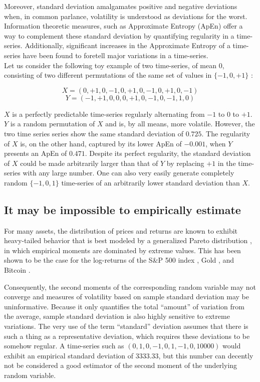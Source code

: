 \documentclass[12pt]{article}
\begin{document}
Moreover, standard deviation amalgamates positive and negative deviations when, in common parlance, volatility is understood as deviations for the worst. Information theoretic measures, such as Approximate Entropy (ApEn) \cite{pincus91} offer a way to complement these standard deviation by quantifying regularity in a time-series. Additionally, significant increases in the Approximate Entropy of a time-series have been found \cite{pincus04} to foretell major variations in a time-series.\\

Let us consider the following toy example of two time-series, of mean $0$, consisting of two different permutations of the same set of values in $\{-1,0,+1\}$ : 

$$X=(0,+1,0,-1,0,+1,0,-1,0,+1,0,-1)$$
$$Y=(-1,+1,0,0,0,+1,0,-1,0,-1,1,0)$$

$X$ is a perfectly predictable time-series regularly alternating from $-1$ to $0$ to $+1$. $Y$ is a random permutation of $X$ and is, by all means, more volatile. However, the two time series series show the same standard deviation of $0.725$. The regularity of $X$ is, on the other hand, captured by its lower ApEn of $-0.001$, when $Y$ presents an ApEn of $0.471$. Despite its perfect regularity, the standard deviation of $X$ could be made arbitrarily larger than that of $Y$ by replacing $+1$ in the time-series with any large number. One can also very easily generate completely random $\{-1,0,1\}$ time-series of an arbitrarily lower standard deviation than $X$.\\



\subsection{It may be impossible to empirically estimate}
For many assets, the distribution of prices and returns are known to exhibit heavy-tailed behavior \cite{sornette} that is best modeled by a generalized Pareto distribution \cite{coles}, in which empirical moments are dominated by extreme values. This has been shown to be the case for the log-returns of the S\&P 500 index \cite{spfat}, Gold \cite{goldfat}, and Bitcoin \cite{btcfat}.

Consequently, the second moments of the corresponding random variable may not converge and measures of volatility based on sample standard deviation may be uninformative. Because it only quantifies the total “amount” of variation from the average, sample standard deviation is also highly sensitive to extreme variations. The very use of the term “standard” deviation assumes that there is such a thing as a representative deviation, which requires these deviations to be somehow regular. A time-series such as $(0,1,0,-1,0,1,-1,0,10000)$ would exhibit an empirical standard deviation of $3333.33$, but this number can decently not be considered a good estimator of the second moment of the underlying random variable.
\end{document}
